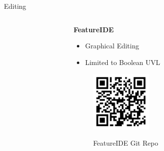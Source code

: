 \documentclass[
	aspectratio=169, %
	8pt, %
	nosectionframes, %
]{beamer}
\newcommand{\inlinesubtitle}[1]{\textcolor{gray!60}{~{}~#1}}
\begin{document}
\begin{frame}{\insertsection \inlinesubtitle{Editing}}
\begin{columns}[t]
\begin{column}{0.3\textwidth}
		\end{column}
  		\begin{column}{0.3\textwidth}
            \textbf{FeatureIDE}
			\begin{itemize}
                    \item Graphical Editing
                    \item Limited to Boolean UVL
			\end{itemize}
   			            \begin{figure}
                \centering
                \includegraphics[width=3cm]{pics/qr/featureide.pdf}
                
                FeatureIDE Git Repo
            \end{figure}

		\end{column}
	\end{columns}
\end{frame}
\end{document}
